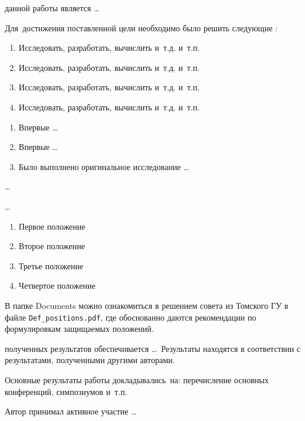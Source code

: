 
{\actuality} 


{\aim} данной работы является \ldots

Для~достижения поставленной цели необходимо было решить следующие {\tasks}:
\begin{enumerate}
  \item Исследовать, разработать, вычислить и~т.\:д. и~т.\:п.
  \item Исследовать, разработать, вычислить и~т.\:д. и~т.\:п.
  \item Исследовать, разработать, вычислить и~т.\:д. и~т.\:п.
  \item Исследовать, разработать, вычислить и~т.\:д. и~т.\:п.
\end{enumerate}


{\novelty}
\begin{enumerate}
  \item Впервые \ldots
  \item Впервые \ldots
  \item Было выполнено оригинальное исследование \ldots
\end{enumerate}

{\influence} \ldots

{\methods} \ldots

{}
\begin{enumerate}
  \item Первое положение
  \item Второе положение
  \item Третье положение
  \item Четвертое положение
\end{enumerate}
В папке Documents можно ознакомиться в решением совета из Томского ГУ
в файле \verb+Def_positions.pdf+, где обоснованно даются рекомендации
по формулировкам защищаемых положений. 

{\reliability} полученных результатов обеспечивается \ldots \ Результаты находятся в соответствии с результатами, полученными другими авторами.


{\probation}
Основные результаты работы докладывались~на:
перечисление основных конференций, симпозиумов и~т.\:п.

{\contribution} Автор принимал активное участие \ldots

